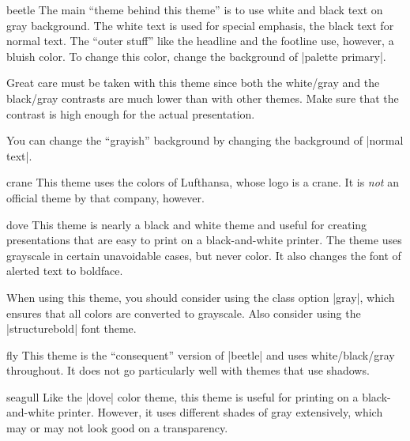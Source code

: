 \begin{colorthemeexample}{beetle}
  The main ``theme behind this theme'' is to use white and black text
  on gray background. The white text is used for special emphasis, the
  black text for normal text. The ``outer stuff'' like the headline
  and the footline use, however, a bluish color. To change this color,
  change the background of |palette primary|.

  Great care must be taken with this theme since both the white/gray
  and the black/gray contrasts are much lower than with other
  themes. Make sure that the contrast is high enough for the actual
  presentation.

  You can change the ``grayish'' background by changing the background
  of |normal text|.
\end{colorthemeexample}

\begin{colorthemeexample}{crane}
  This theme uses the colors of Lufthansa, whose logo is a crane.
  It is \emph{not} an official theme by that company, however.
\end{colorthemeexample}

\begin{colorthemeexample}{dove}
  This theme is nearly a black and white theme and useful for creating
  presentations that are easy to print on a black-and-white
  printer. The theme uses grayscale in certain unavoidable cases, but
  never color. It also changes the font of alerted text to boldface.

  When using this theme, you should consider using the class option
  |gray|, which ensures that all colors are converted to
  grayscale. Also consider using the |structurebold| font theme.
\end{colorthemeexample}


\begin{colorthemeexample}{fly}
  This theme is the ``consequent'' version  of |beetle| and uses
  white/black/gray throughout. It does not go particularly well with
  themes that use shadows.
\end{colorthemeexample}

\begin{colorthemeexample}{seagull}
  Like the |dove| color theme, this theme is useful for printing on a
  black-and-white printer. However, it uses different shades of gray
  extensively, which may or may not look good on a transparency.
\end{colorthemeexample}


